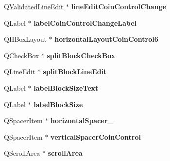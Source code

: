 \begin{DoxyCompactItemize}
\mbox{\hyperlink{class_q_validated_line_edit}{Q\+Validated\+Line\+Edit}} $\ast$ {\bfseries line\+Edit\+Coin\+Control\+Change}
\item 
\mbox{\label{class_ui___send_coins_dialog_a51f3cf4681f2567e8917ffd2b77f5731}} 
Q\+Label $\ast$ {\bfseries label\+Coin\+Control\+Change\+Label}
\item 
\mbox{\label{class_ui___send_coins_dialog_ad08051f8d822c5f58504a63b0fe9411f}} 
Q\+H\+Box\+Layout $\ast$ {\bfseries horizontal\+Layout\+Coin\+Control6}
\item 
\mbox{\label{class_ui___send_coins_dialog_a48bdb31a60581f1eaf470f1277450b8d}} 
Q\+Check\+Box $\ast$ {\bfseries split\+Block\+Check\+Box}
\item 
\mbox{\label{class_ui___send_coins_dialog_aeb32fbbb75b7e9f71aedf65c30c31420}} 
Q\+Line\+Edit $\ast$ {\bfseries split\+Block\+Line\+Edit}
\item 
\mbox{\label{class_ui___send_coins_dialog_a689d12c9e712c2472cac008c37e545a9}} 
Q\+Label $\ast$ {\bfseries label\+Block\+Size\+Text}
\item 
\mbox{\label{class_ui___send_coins_dialog_a03c2a6f221cccc48d28c001ce6c6192d}} 
Q\+Label $\ast$ {\bfseries label\+Block\+Size}
\item 
\mbox{\label{class_ui___send_coins_dialog_ae4a43ee86d290d37c020e55983dea03a}} 
Q\+Spacer\+Item $\ast$ {\bfseries horizontal\+Spacer\+\_}
\item 
\mbox{\label{class_ui___send_coins_dialog_a96af9da56f058a947d708709d6b8dbeb}} 
Q\+Spacer\+Item $\ast$ {\bfseries vertical\+Spacer\+Coin\+Control}
\item 
\mbox{\label{class_ui___send_coins_dialog_a70cca2daa46b4445e1014fc49149885d}} 
Q\+Scroll\+Area $\ast$ {\bfseries scroll\+Area}
\item 
\mbox{\label{class_ui___send_coins_dialog_a00118e514a32fd9904ab9de6760e6bdb}} 

\end{DoxyCompactItemize}
